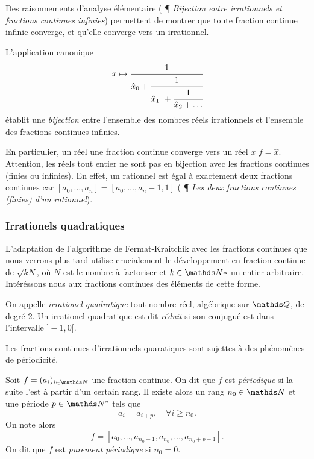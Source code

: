 Des raisonnements d'analyse élémentaire (\cite{wikiu} ¶ \emph{Bijection entre
irrationnels et fractions continues infinies}) permettent de montrer que toute
fraction continue infinie converge, et qu'elle converge vers un irrationnel.

\begin{theoreme}
	L'application canonique \[x \mapsto \cfrac{1}{\hat{x}_0 +
	\cfrac{1}{\hat{x}_1 + \cfrac{1}{\hat{x}_2 + \dots}}}\] établit une
	\emph{bijection} entre l'ensemble des nombres réels irrationnels et
	l'ensemble des fractions continues infinies.
\end{theoreme}

En particulier, un réel une fraction continue converge vers un réel $x$ \ssi
$f=\hat{x}$. Attention, les réels tout entier ne sont pas en bijection avec les
fractions continues (finies ou infinies). En effet, un rationnel est égal à
exactement deux fractions continues car $[a_0, \dots, a_n] = [a_0, \dots, a_n -
1, 1]$ (\cite{wikiu} ¶ \emph{Les deux fractions continues (finies) d'un
rationnel}).

\subsubsection{Irrationels quadratiques}
\label{ss-irrquad}

L'adaptation de l'algorithme de Fermat-Kraitchik avec les fractions continues
que nous verrons plus tard utilise crucialement le développement en fraction
continue de $\sqrt{kN}$, où $N$ est le nombre à factoriser et $k\in \N*$ un
entier arbitraire. Intéréssons nous aux fractions continues des éléments de
cette forme.

\begin{definition}
	On appelle \emph{irrationel quadratique} tout nombre réel, algébrique sur
	$\Q$, de degré $2$. Un irrationel quadratique est dit \emph{réduit} si son
	conjugué est dans l'intervalle $]-1, 0[$.
\end{definition}

Les fractions continues d'irrationnels quaratiques sont sujettes à des
phénomènes de périodicité.

\begin{definition}
	Soit $f = (a_i)_{i\in \N}$ une fraction continue. On dit que $f$ est
	\emph{périodique} si la suite l'est à partir d'un certain rang. Il existe
	alors un rang $n_0\in \N$ et une période $p\in \N^*$ tels que \[a_{i} =
	a_{i+p}, \quad \forall i\geq n_0.\] On note alors \[f = [a_0, \dots, a_{n_0
	- 1}, \overline{a_{n_0}, \dots, a_{n_0 + p -1}}].\] On dit que $f$ est
	\emph{purement périodique} si $n_0 = 0$.
\end{definition}

